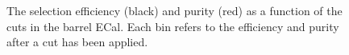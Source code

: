\begin{figure}
\begin{minipage}{.5\linewidth}
\centering
{}
\end{minipage}\par\medskip
\caption{The selection efficiency (black) and purity (red) as a function of the cuts in the barrel ECal.  Each bin refers to the efficiency and purity after a cut has been applied.}
\label{fig:SelEffPurCutLevelBarrel}
\end{figure}

